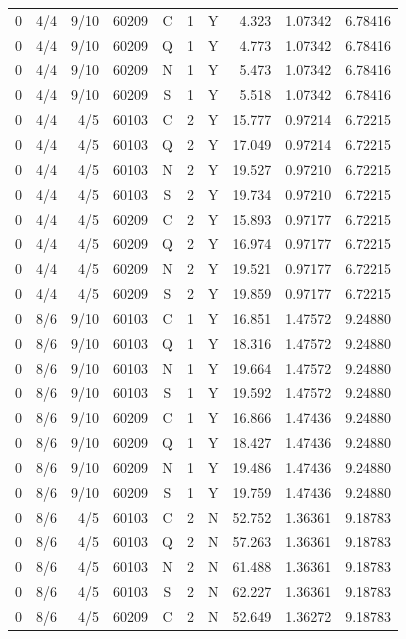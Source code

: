 \begin{longtable}{rlrrcccrrr}
0 & 4/4 & 9/10 & 60209 & C & 1 & Y & 4.323 & 1.07342 & 6.78416 \\
0 & 4/4 & 9/10 & 60209 & Q & 1 & Y & 4.773 & 1.07342 & 6.78416 \\
0 & 4/4 & 9/10 & 60209 & N & 1 & Y & 5.473 & 1.07342 & 6.78416 \\
0 & 4/4 & 9/10 & 60209 & S & 1 & Y & 5.518 & 1.07342 & 6.78416 \\
0 & 4/4 & 4/5 & 60103 & C & 2 & Y & 15.777 & 0.97214 & 6.72215 \\
0 & 4/4 & 4/5 & 60103 & Q & 2 & Y & 17.049 & 0.97214 & 6.72215 \\
0 & 4/4 & 4/5 & 60103 & N & 2 & Y & 19.527 & 0.97210 & 6.72215 \\
0 & 4/4 & 4/5 & 60103 & S & 2 & Y & 19.734 & 0.97210 & 6.72215 \\
0 & 4/4 & 4/5 & 60209 & C & 2 & Y & 15.893 & 0.97177 & 6.72215 \\
0 & 4/4 & 4/5 & 60209 & Q & 2 & Y & 16.974 & 0.97177 & 6.72215 \\
0 & 4/4 & 4/5 & 60209 & N & 2 & Y & 19.521 & 0.97177 & 6.72215 \\
0 & 4/4 & 4/5 & 60209 & S & 2 & Y & 19.859 & 0.97177 & 6.72215 \\
0 & 8/6 & 9/10 & 60103 & C & 1 & Y & 16.851 & 1.47572 & 9.24880 \\
0 & 8/6 & 9/10 & 60103 & Q & 1 & Y & 18.316 & 1.47572 & 9.24880 \\
0 & 8/6 & 9/10 & 60103 & N & 1 & Y & 19.664 & 1.47572 & 9.24880 \\
0 & 8/6 & 9/10 & 60103 & S & 1 & Y & 19.592 & 1.47572 & 9.24880 \\
0 & 8/6 & 9/10 & 60209 & C & 1 & Y & 16.866 & 1.47436 & 9.24880 \\
0 & 8/6 & 9/10 & 60209 & Q & 1 & Y & 18.427 & 1.47436 & 9.24880 \\
0 & 8/6 & 9/10 & 60209 & N & 1 & Y & 19.486 & 1.47436 & 9.24880 \\
0 & 8/6 & 9/10 & 60209 & S & 1 & Y & 19.759 & 1.47436 & 9.24880 \\
0 & 8/6 & 4/5 & 60103 & C & 2 & N & 52.752 & 1.36361 & 9.18783 \\
0 & 8/6 & 4/5 & 60103 & Q & 2 & N & 57.263 & 1.36361 & 9.18783 \\
0 & 8/6 & 4/5 & 60103 & N & 2 & N & 61.488 & 1.36361 & 9.18783 \\
0 & 8/6 & 4/5 & 60103 & S & 2 & N & 62.227 & 1.36361 & 9.18783 \\
0 & 8/6 & 4/5 & 60209 & C & 2 & N & 52.649 & 1.36272 & 9.18783 \\

\end{longtable}
